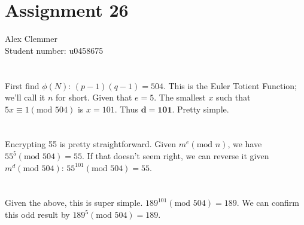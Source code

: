 \documentclass[a4paper]{article}
\begin{document}
\section*{Assignment 26}
Alex Clemmer\\
Student number: u0458675

\section{}

First find $\phi(N)$: $(p-1)(q-1) = 504$. This is the Euler Totient Function; we'll call it $n$ for short. Given that $e = 5$. The smallest $x$ such that $5x \equiv 1 (\mbox{mod } 504)$ is $x=101$. Thus $\mathbf{d = 101}$. Pretty simple.

\section{}

Encrypting 55 is pretty straightforward. Given $m^e (\mbox{mod } n)$, we have $55^5 (\mbox{mod } 504) = 55$. If that doesn't seem right, we can reverse it given $m^d  (\mbox{mod } 504)$: $55^{101}  (\mbox{mod } 504) = 55$.

\section{}

Given the above, this is super simple. $189^101 (\mbox{mod } 504) = 189$. We can confirm this odd result by $189^{5}  (\mbox{mod } 504) = 189$.
\end{document}
